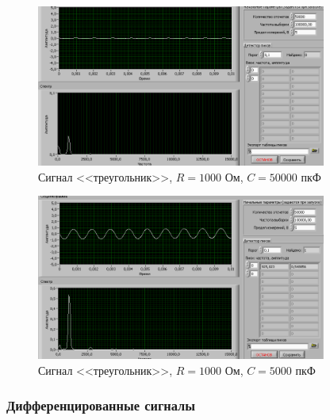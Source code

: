 
\begin{figure}[H]
	\centering
	\includegraphics[width=0.85\textwidth]{pic/int/triangle_r_1000_c_50000.png}
	\caption{Сигнал <<треугольник>>, $R=1000$ Ом, $C=50000$ пкФ}
\end{figure}
\begin{figure}[H]
	\centering
	\includegraphics[width=0.85\textwidth]{pic/int/triangle_r_1000_c_5000.png}
	\caption{Сигнал <<треугольник>>, $R=1000$ Ом, $C=5000$ пкФ}
\end{figure}

\subsubsection{Дифференцированные сигналы}

